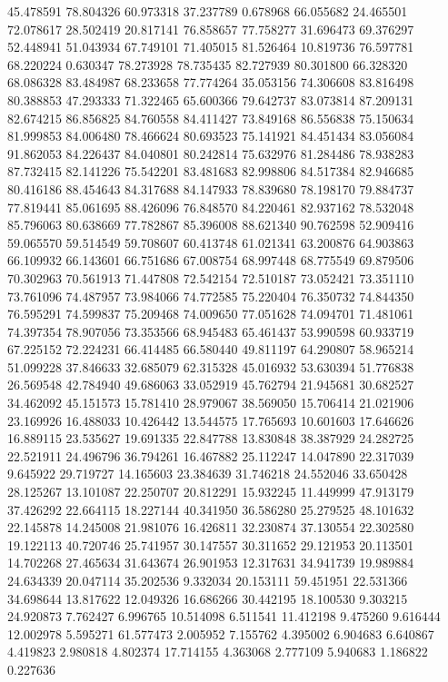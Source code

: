 45.478591
78.804326
60.973318
37.237789
0.678968
66.055682
24.465501
72.078617
28.502419
20.817141
76.858657
77.758277
31.696473
69.376297
52.448941
51.043934
67.749101
71.405015
81.526464
10.819736
76.597781
68.220224
0.630347
78.273928
78.735435
82.727939
80.301800
66.328320
68.086328
83.484987
68.233658
77.774264
35.053156
74.306608
83.816498
80.388853
47.293333
71.322465
65.600366
79.642737
83.073814
87.209131
82.674215
86.856825
84.760558
84.411427
73.849168
86.556838
75.150634
81.999853
84.006480
78.466624
80.693523
75.141921
84.451434
83.056084
91.862053
84.226437
84.040801
80.242814
75.632976
81.284486
78.938283
87.732415
82.141226
75.542201
83.481683
82.998806
84.517384
82.946685
80.416186
88.454643
84.317688
84.147933
78.839680
78.198170
79.884737
77.819441
85.061695
88.426096
76.848570
84.220461
82.937162
78.532048
85.796063
80.638669
77.782867
85.396008
88.621340
90.762598
52.909416
59.065570
59.514549
59.708607
60.413748
61.021341
63.200876
64.903863
66.109932
66.143601
66.751686
67.008754
68.997448
68.775549
69.879506
70.302963
70.561913
71.447808
72.542154
72.510187
73.052421
73.351110
73.761096
74.487957
73.984066
74.772585
75.220404
76.350732
74.844350
76.595291
74.599837
75.209468
74.009650
77.051628
74.094701
71.481061
74.397354
78.907056
73.353566
68.945483
65.461437
53.990598
60.933719
67.225152
72.224231
66.414485
66.580440
49.811197
64.290807
58.965214
51.099228
37.846633
32.685079
62.315328
45.016932
53.630394
51.776838
26.569548
42.784940
49.686063
33.052919
45.762794
21.945681
30.682527
34.462092
45.151573
15.781410
28.979067
38.569050
15.706414
21.021906
23.169926
16.488033
10.426442
13.544575
17.765693
10.601603
17.646626
16.889115
23.535627
19.691335
22.847788
13.830848
38.387929
24.282725
22.521911
24.496796
36.794261
16.467882
25.112247
14.047890
22.317039
9.645922
29.719727
14.165603
23.384639
31.746218
24.552046
33.650428
28.125267
13.101087
22.250707
20.812291
15.932245
11.449999
47.913179
37.426292
22.664115
18.227144
40.341950
36.586280
25.279525
48.101632
22.145878
14.245008
21.981076
16.426811
32.230874
37.130554
22.302580
19.122113
40.720746
25.741957
30.147557
30.311652
29.121953
20.113501
14.702268
27.465634
31.643674
26.901953
12.317631
34.941739
19.989884
24.634339
20.047114
35.202536
9.332034
20.153111
59.451951
22.531366
34.698644
13.817622
12.049326
16.686266
30.442195
18.100530
9.303215
24.920873
7.762427
6.996765
10.514098
6.511541
11.412198
9.475260
9.616444
12.002978
5.595271
61.577473
2.005952
7.155762
4.395002
6.904683
6.640867
4.419823
2.980818
4.802374
17.714155
4.363068
2.777109
5.940683
1.186822
0.227636
